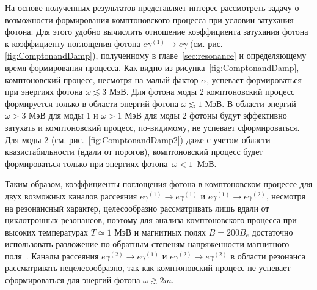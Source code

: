 На основе полученных результатов представляет интерес рассмотреть задачу о 
возможности формирования комптоновского процесса при условии затухания фотона. 
Для этого удобно вычислить отношение коэффициента затухания фотона к 
коэффициенту поглощения фотона $e\gamma^{(1)}\to e\gamma$  (см. рис. 
\ref{fig:ComptonandDamp}), полученному в главе~\ref{sec:resonance} и 
определяющему время 
формирования процесса. Как видно из рисунка~\ref{fig:ComptonandDamp}, 
комптоновский 
процесс, несмотря на малый фактор $\alpha$, успевает формироваться при энергиях 
фотона $\omega\lesssim3$ МэВ. Для фотона моды 2 комптоновский процесс 
формируется только в области энергий фотона $\omega\lesssim1$ МэВ. В области 
энергий $\omega>3$ МэВ для моды 1 и $\omega>1$ МэВ для моды 2 фотоны будут 
эффективно 
затухать и комптоновский процесс, по-видимому, не успевает сформироваться. Для 
моды 2 (см. рис.~\ref{fig:ComptonandDamp2}) даже с учетом области 
квазистабильности (вдали от порогов), комптоновский процесс будет формироваться 
только при энергиях фотона~$\omega<1$~МэВ.

Таким образом, коэффициенты поглощения фотона в комптоновском процессе для двух 
возможных каналов рассеяния $e\gamma^{(1)}  \to e\gamma^{(1)}$ и 
$e\gamma^{(1)}  \to e\gamma^{(2)}$, несмотря на резонансный характер, 
целесообразно рассматривать лишь вдали от циклотронных резонансов, поэтому для 
анализа комптоновского процесса при высоких температурах $T\simeq 1$ МэВ и 
магнитных полях $B=200 B_e$ достаточно использовать разложение по обратным 
степеням напряженности магнитного поля~\cite{Chistyakov:2009}. Каналы  
рассеяния $e\gamma^{(2)}  \to e\gamma^{(1)}$  и $e\gamma^{(2)}  \to 
e\gamma^{(2)}$ в области резонанса рассматривать нецелесообразно, так как 
комптоновский процесс не успевает сформироваться для энергий фотона 
$\omega\gtrsim 2m$.

